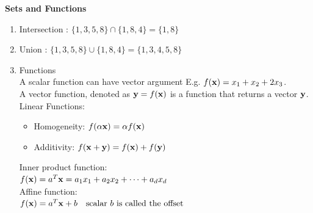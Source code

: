 \textbf{Sets and Functions}
\begin{enumerate}
    \item Intersection : $\{1,3,5,8\}\cap\{1,8,4\} = \{1,8\}$
    \item Union : $\{1,3,5,8\} \cup \{1,8,4\} = \{1,3,4,5,8\}$
    \item Functions \\
    A scalar function can have vector argument E.g. $f(\mathbf{x}) = x_1+x_2+2x_3$. \\
    A vector function, denoted as $\mathbf{y} = f(\mathbf{x})$ is a function that returns a vector $\mathbf{y}$. \\
    Linear Functions: 
    \begin{itemize}
        \item Homogeneity: $f(\alpha \mathbf{x}) = \alpha f(\mathbf{x})$
        \item Additivity: $f(\mathbf{x}+\mathbf{y}) = f(\mathbf{x})+f(\mathbf{y})$
    \end{itemize}
    Inner product function: \\
    $f(\mathbf{x}) = a^T \mathbf{x} = a_1 x_1 + a_2 x_2 + \cdots + a_d x_d$ \\
    Affine function: \\
    $f(\mathbf{x}) = a^T\mathbf{x}+b \quad \text{scalar $b$ is called the offset}$
\end{enumerate}
